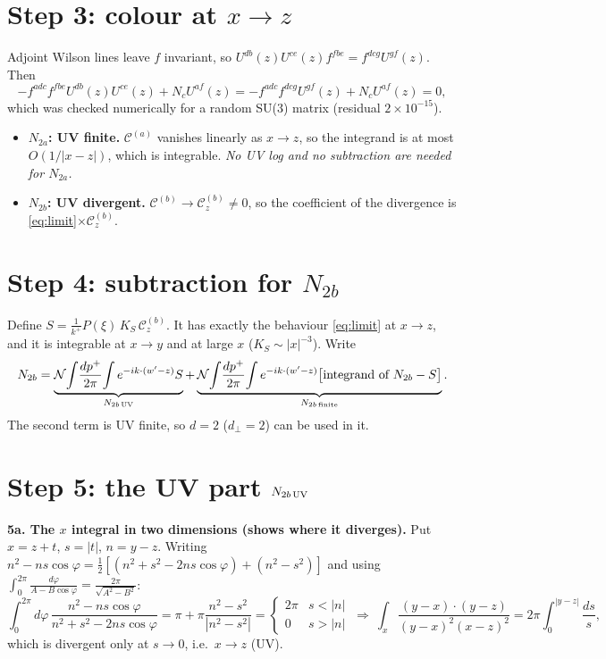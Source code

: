 \documentclass[10pt]{article}
\numberwithin{equation}{section}
\begin{document}
\section{Step 3: colour at $x\to z$}
Adjoint Wilson lines leave $f$ invariant, so $U^{db}(z)U^{ce}(z)f^{fbe}=f^{dcg}U^{gf}(z)$. Then
\begin{equation}
-f^{adc}f^{fbe}U^{db}(z)U^{ce}(z)+N_{c}U^{af}(z)=-f^{adc}f^{dcg}U^{gf}(z)+N_{c}U^{af}(z)=0,
\end{equation}
which was checked numerically for a random SU(3) matrix (residual $2\times10^{-15}$).
\begin{itemize}
\item \textbf{$N_{2a}$: UV finite.} $\mathcal{C}^{(a)}$ vanishes linearly as $x\to z$, so the integrand is at most $O(1/|x-z|)$, which is integrable. \emph{No UV log and no subtraction are needed for $N_{2a}$.}
\item \textbf{$N_{2b}$: UV divergent.} $\mathcal{C}^{(b)}\to\mathcal{C}^{(b)}_{z}\neq0$, so the coefficient of the divergence is \eqref{eq:limit}$\times\mathcal{C}^{(b)}_{z}$.
\end{itemize}

\section{Step 4: subtraction for $N_{2b}$}
Define $S=\frac{1}{k^{+}}P(\xi)\,K_{S}\,\mathcal{C}^{(b)}_{z}$. It has exactly the behaviour \eqref{eq:limit} at $x\to z$, and it is integrable at $x\to y$ and at large $x$ ($K_{S}\sim|x|^{-3}$). Write
\begin{equation}
N_{2b}=\underbrace{\mathcal{N}\!\int\!\frac{dp^{+}}{2\pi}\!\int e^{-ik\cdot(w'-z)}S}_{N_{2b\,\rm UV}}+\underbrace{\mathcal{N}\!\int\!\frac{dp^{+}}{2\pi}\!\int e^{-ik\cdot(w'-z)}\big[\text{integrand of }N_{2b}-S\big]}_{N_{2b\,\rm finite}}.
\end{equation}
The second term is UV finite, so $d=2$ ($d_{\perp}=2$) can be used in it.

\section{Step 5: the UV part $N_{2b\,\rm UV}$}
\textbf{5a. The $x$ integral in two dimensions (shows where it diverges).} Put $x=z+t$, $s=|t|$, $n=y-z$. Writing $n^{2}-ns\cos\varphi=\frac12[(n^{2}+s^{2}-2ns\cos\varphi)+(n^{2}-s^{2})]$ and using $\int_{0}^{2\pi}\frac{d\varphi}{A-B\cos\varphi}=\frac{2\pi}{\sqrt{A^{2}-B^{2}}}$:
\begin{equation}
\int_{0}^{2\pi}d\varphi\,\frac{n^{2}-ns\cos\varphi}{n^{2}+s^{2}-2ns\cos\varphi}=\pi+\pi\frac{n^{2}-s^{2}}{|n^{2}-s^{2}|}=\begin{cases}2\pi&s<|n|\\0&s>|n|\end{cases}
\ \Rightarrow\ \int_{x}\frac{(y-x)\cdot(y-z)}{(y-x)^{2}(x-z)^{2}}=2\pi\int_{0}^{|y-z|}\frac{ds}{s},
\end{equation}
which is divergent only at $s\to0$, i.e.\ $x\to z$ (UV).
\end{document}
